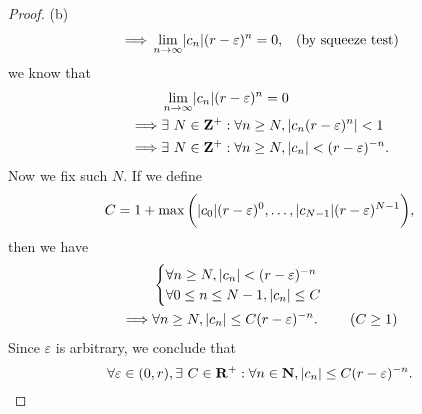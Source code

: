 \begin{proof}{(b)}
\begin{align*}
        \implies & \lim_{n \to \infty} \abs{c_n} (r - \varepsilon)^n = 0,                                  & \text{(by squeeze test)}
    \end{align*}
    we know that
    \begin{align*}
                 & \lim_{n \to \infty} \abs{c_n} (r - \varepsilon)^n = 0                       \\
        \implies & \exists\ N \in \Z^+ : \forall n \geq N, \abs{c_n (r - \varepsilon)^n} < 1   \\
        \implies & \exists\ N \in \Z^+ : \forall n \geq N, \abs{c_n} < (r - \varepsilon)^{-n}.
    \end{align*}
    Now we fix such \(N\).
    If we define
    \[
        C = 1 + \max\bigg(\abs{c_0} (r - \varepsilon)^0, \dots, \abs{c_{N - 1}} (r - \varepsilon)^{N - 1}\bigg),
    \]
    then we have
    \begin{align*}
                 & \begin{cases}
                       \forall n \geq N, \left\lvert c_n\right\rvert < (r - \varepsilon)^{-n} \\
                       \forall 0 \leq n \leq N - 1, \left\lvert c_n\right\rvert \leq C
                   \end{cases}                    \\
        \implies & \forall n \geq N, \left\lvert c_n\right\rvert \leq C (r - \varepsilon)^{-n}. & (C \geq 1)
    \end{align*}
    Since \(\varepsilon\) is arbitrary, we conclude that
    \[
        \forall \varepsilon \in (0, r), \exists\ C \in \mathbf{R}^+ : \forall n \in \mathbf{N}, \left\lvert c_n\right\rvert \leq C (r - \varepsilon)^{-n}.
    \]
\end{proof}

